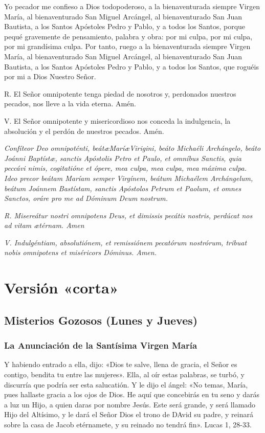 \documentclass[a4paper,11pt, oneside]{report}
\begin{document}
    Yo pecador me confieso a Dios todopoderoso, a la bienaventurada siempre Virgen María, al bienaventurado San Miguel Arcángel,
    al bienaventurado San Juan Bautista, a los Santos Apóstoles Pedro y Pablo, y a todos los Santos, porque pequé gravemente de 
    pensamiento, palabra y obra: por mi culpa, por mi culpa, por mi grandísima culpa. Por tanto, ruego a la bienaventurada siempre
    Virgen María, al bienaventurado San Miguel Arcángel, al bienaventurado San Juan Bautista, a los Santos Apóstoles Pedro y Pablo,
    y a todos los Santos, que roguéis por mi a Dios Nuestro Señor.\par\smallbreak{}
    R. El Señor omnipotente tenga piedad de nosotros y, perdonados nuestros pecados, nos lleve a la vida eterna. Amén.\par\smallbreak{}
    V. El Señor omnipotente y misericordioso nos conceda la indulgencia, la absolución y el perdón de nuestros pecados. Amén.

    \medskip

    \textit{Confíteor Deo omnipoténti, beát\ae Marí\ae Virigini, beáto Michaéli Archángelo, beáto Joánni Baptíst\ae, sanctis Apóstolis
    Petro et Paulo, et omníbus Sanctis, quia peccávi nimis, cogitatióne et ópere, mea culpa, mea culpa, mea máxima culpa. Ideo precor
    beátam Maríam semper Virgínem, beátum Michaélem Archángelum, beátum Joánnem Bastístam, sanctis Apóstolos Petrum et Paolum, et omnes
    Sanctos, oráre pro me ad Dóminum Deum nostrum.}\par\smallbreak{}
    \textit{R. Misereátur nostri omnipotens Deus, et dimissis pecátis nostris, perdúcat nos ad vitam {\ae}térnam. Amen}\par\smallbreak{}
    \textit{V. Indulgéntiam, absolutiónem, et remissiónem pecatórum nostrórum, tribuat nobis omnipotens et miséricors Dóminus. Amen.}
    
  \chapter*{Versión «corta»}

    \section*{Misterios Gozosos (Lunes y Jueves)}
      
      \subsection*{La Anunciación de la Santísima Virgen María}
        Y habiendo entrado a ella, dijo: «Dios te salve, llena de gracia, el Señor es contigo, bendita tu entre las mujeres». Ella, al oír estas palabras, se turbó,
        y discurría que podría ser esta salucatión. Y le dijo el ángel: «No temas, María, pues hallaste gracia a los ojos de Dios. He aquí que concebirás en tu seno
        y darás a luz un Hijo, a quien daras por nombre Jesús. Este será grande, y será llamado Hijo del Altísimo, y le dará el Señor Dios el trono de DAvid su padre,
        y reinará sobre la casa de Jacob etérnamete, y su reinado no tendrá fin». Lucas 1, 28-33.
        
\end{document}

